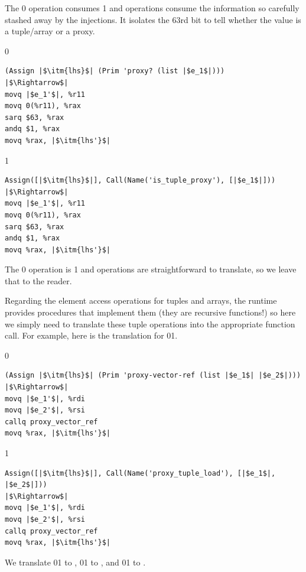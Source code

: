 \documentclass[7x10]{TimesAPriori_MIT}%
\def\racketEd{0}
\def\pythonEd{1}
\def\edition{0}
\newcommand{\racket}[1]{{\if\edition\racketEd{#1}\fi}}
\newcommand{\python}[1]{{\if\edition\pythonEd #1\fi}}
\numberwithin{theorem}{chapter}
\numberwithin{definition}{chapter}
\numberwithin{equation}{chapter}
\begin{document}
The \racket{ operation consumes}
\python{ and  operations consume}
the information so carefully
stashed away by the injections.  It
isolates the $63$rd bit to tell whether the value is a tuple/array or
a proxy.
%
{\if\edition\racketEd
\begin{lstlisting}
(Assign |$\itm{lhs}$| (Prim 'proxy? (list |$e_1$|)))
|$\Rightarrow$|
movq |$e_1'$|, %r11
movq 0(%r11), %rax
sarq $63, %rax
andq $1, %rax
movq %rax, |$\itm{lhs'}$|
\end{lstlisting}
\fi}%
%
{\if\edition\pythonEd
\begin{lstlisting}
Assign([|$\itm{lhs}$|], Call(Name('is_tuple_proxy'), [|$e_1$|]))
|$\Rightarrow$|
movq |$e_1'$|, %r11
movq 0(%r11), %rax
sarq $63, %rax
andq $1, %rax
movq %rax, |$\itm{lhs'}$|
\end{lstlisting}
\fi}%
%
The \racket{ operation is}
\python{ and  operations are}
straightforward to translate, so we leave that to the reader.

Regarding the element access operations for tuples and arrays, the
runtime provides procedures that implement them (they are recursive
functions!)  so here we simply need to translate these tuple
operations into the appropriate function call. For example, here is
the translation for
\racket{}\python{}.
{\if\edition\racketEd
\begin{lstlisting}
(Assign |$\itm{lhs}$| (Prim 'proxy-vector-ref (list |$e_1$| |$e_2$|)))
|$\Rightarrow$|
movq |$e_1'$|, %rdi
movq |$e_2'$|, %rsi
callq proxy_vector_ref
movq %rax, |$\itm{lhs'}$|
\end{lstlisting}
\fi}
{\if\edition\pythonEd
\begin{lstlisting}
Assign([|$\itm{lhs}$|], Call(Name('proxy_tuple_load'), [|$e_1$|, |$e_2$|]))
|$\Rightarrow$|
movq |$e_1'$|, %rdi
movq |$e_2'$|, %rsi
callq proxy_vector_ref
movq %rax, |$\itm{lhs'}$|
\end{lstlisting}
\fi}
We translate 
\racket{}\python{}
to ,
\racket{}\python{}
to , and
\racket{}\python{}
to .
\end{document}
